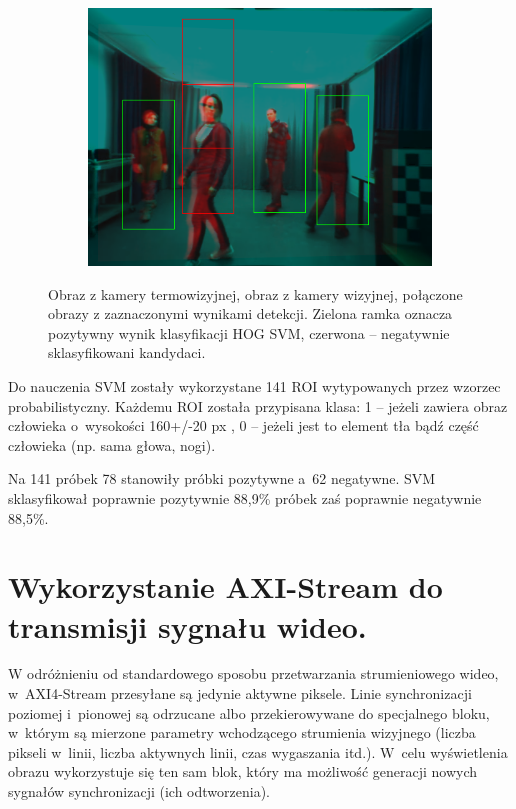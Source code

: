 \begin{figure}[h]
\begin{subfigure}{0.32\textwidth}
\subcaption{\label{fig:sampleRGB}}
\end{subfigure}
\begin{subfigure}{0.32\textwidth}
\centering
\includegraphics[width=0.9\linewidth]{images/sampleHOGSVM}
\subcaption{\label{fig:sampleHOGSVM}}
\end{subfigure}

\caption[Detekcja]{\protect{} Obraz z kamery termowizyjnej, \protect{} obraz z kamery wizyjnej, \protect{} połączone obrazy z zaznaczonymi wynikami detekcji. Zielona ramka oznacza pozytywny wynik klasyfikacji HOG SVM, czerwona -- negatywnie sklasyfikowani kandydaci.}
\end{figure}

Do nauczenia SVM zostały wykorzystane 141 ROI wytypowanych przez wzorzec probabilistyczny. 
Każdemu ROI została przypisana klasa: 1 -- jeżeli zawiera obraz człowieka o~wysokości 160+/-20 px , 0 -- jeżeli jest to element tła bądź część człowieka (np. sama głowa, nogi).

Na 141 próbek 78 stanowiły próbki pozytywne a~62 negatywne. 
SVM sklasyfikował poprawnie pozytywnie 88,9\% próbek zaś poprawnie negatywnie 88,5\%.


\section{Wykorzystanie AXI-Stream do transmisji sygnału wideo.}

W odróżnieniu od standardowego sposobu przetwarzania strumieniowego wideo, w~AXI4-Stream przesyłane są jedynie aktywne piksele.
Linie synchronizacji poziomej i~pionowej są odrzucane albo przekierowywane do specjalnego bloku, w~którym są mierzone parametry wchodzącego strumienia wizyjnego (liczba pikseli w~linii, liczba aktywnych linii, czas wygaszania itd.).
W~celu wyświetlenia obrazu wykorzystuje się ten sam blok, który ma możliwość generacji nowych sygnałów synchronizacji (ich odtworzenia).

